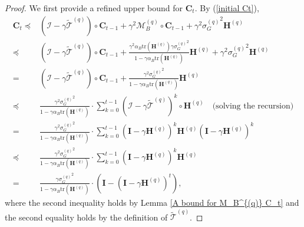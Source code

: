 \documentclass[11pt, letterpaper]{article}
\begin{document}
\begin{proof}
    We first provide a refined upper bound for $\mathbf{C}_t$. By (\ref{initial Ct}),
    \begin{equation}
    \label{bound for C_t}
        \begin{aligned}
            \mathbf{C}_t \preceq &(\mathcal{I}-\gamma\widetilde{\mathcal{T}}^{(q)})\circ \mathbf{C}_{t-1}+\gamma^2\mathcal{M}_B^{(q)}\circ \mathbf{C}_{t-1}+\gamma^2{\sigma_G^{(q)}}^2\mathbf{H}^{(q)}\\
            \preceq & (\mathcal{I}-\gamma\widetilde{\mathcal{T}}^{(q)})\circ \mathbf{C}_{t-1} + \frac{\gamma^2\alpha_B\mathrm{tr}(\mathbf{H}^{(q)})\gamma{\sigma_G^{(q)}}^2}{1-\gamma\alpha_B\mathrm{tr}(\mathbf{H}^{(q)})} \mathbf{H}^{(q)}+\gamma^2{\sigma_G^{(q)}}^2\mathbf{H}^{(q)}\\
            =& (\mathcal{I}-\gamma\widetilde{\mathcal{T}}^{(q)})\circ \mathbf{C}_{t-1} + \frac{\gamma^2{\sigma_G^{(q)}}^2}{1-\gamma\alpha_B\mathrm{tr}(\mathbf{H}^{(q)})} \mathbf{H}^{(q)}\\
            \preceq&\frac{\gamma^2{\sigma_G^{(q)}}^2}{1-\gamma\alpha_B\mathrm{tr}(\mathbf{H}^{(q)})}\cdot\sum_{k=0}^{t-1}(\mathcal{I}-\gamma\widetilde{\mathcal{T}}^{(q)})^k\circ\mathbf{H}^{(q)}\quad\text{(solving the recursion)} \\
            =&\frac{\gamma^2{\sigma_G^{(q)}}^2}{1-\gamma\alpha_B\mathrm{tr}(\mathbf{H}^{(q)})}\cdot\sum_{k=0}^{t-1}(\mathbf{I}-\gamma \mathbf{H}^{(q)})^k\mathbf{H}^{(q)}(\mathbf{I}-\gamma \mathbf{H}^{(q)})^k \\
            \preceq&\frac{\gamma^2{\sigma_G^{(q)}}^2}{1-\gamma\alpha_B\mathrm{tr}(\mathbf{H}^{(q)})}\cdot\sum_{k=0}^{t-1}(\mathbf{I}-\gamma \mathbf{H}^{(q)})^k\mathbf{H}^{(q)} \\
            =&\frac{\gamma{\sigma_G^{(q)}}^2}{1-\gamma\alpha_B\mathrm{tr}(\mathbf{H}^{(q)})}\cdot\left(\mathbf{I}-(\mathbf{I}-\gamma\mathbf{H}^{(q)})^t\right),
        \end{aligned}
    \end{equation}
    where the second inequality holds by Lemma \ref{A bound for M_B^{(q)} C_t} and the second equality holds by the definition of $\widetilde{\mathcal{T}}^{(q)}$.


\end{proof}
\end{document}
